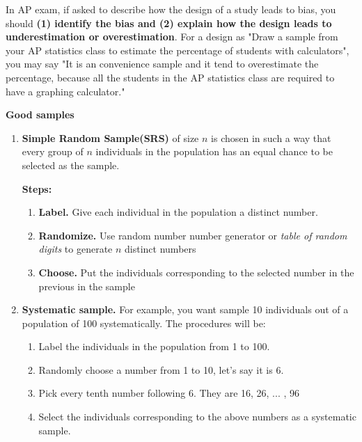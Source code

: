 \documentclass[a4paper, 12pt,twoside]{book}
\begin{document}
\colorbox{babypink}{\parbox{\textwidth}{
In AP exam, if asked to describe how the design of a study leads to bias, you should \textbf{(1) identify the bias and (2) explain how the design leads to underestimation or overestimation}. For a design as "Draw a sample from your AP statistics class to estimate the percentage of students with calculators", you may say "It is an convenience sample and it tend to overestimate the percentage, because all the students in the AP statistics class are required to have a graphing calculator."
}}
\vspace{0.3cm}

\textbf{\large{Good samples}}
\vspace{0.3cm}

\begin{enumerate}

\item \textbf{Simple Random Sample(SRS)} of size $n$ is chosen in such a way that every group of $n$ individuals in the population has an equal chance to be selected as the sample.

\textbf{Steps:}
   \begin{enumerate}[(1)]
       \item \textbf{Label.} Give each individual in the population a distinct number.
       \item \textbf{Randomize.} Use random number number generator or \textit{table of random digits} to generate $n$ distinct numbers
       \item \textbf{Choose.} Put the individuals corresponding to the selected  number in the previous in the sample
   \end{enumerate}
   \vspace{0.3cm}
   
\item \textbf{Systematic sample.} For example, you want sample 10 individuals out of a population of 100 systematically. The procedures will be:
    \begin{enumerate}[(1)]
        \item Label the individuals in the population from 1 to 100.
        \item Randomly choose a number from 1 to 10, let's say it is 6.
        \item Pick every tenth number following 6. They are 16, 26, ... , 96
        \item Select the individuals corresponding to the above numbers as a systematic sample.
    \end{enumerate}
    \vspace{0.3cm}
    

\end{enumerate}
\end{document}
